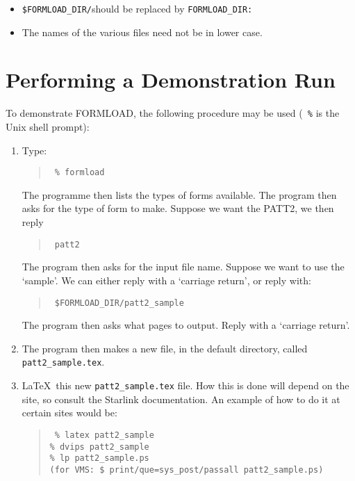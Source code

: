 \begin{itemize}
\item {\tt \$FORMLOAD\_DIR/}should be replaced by {\tt FORMLOAD\_DIR:}
\item The names of the various files need not be in lower case.
\end{itemize}

\section{Performing a Demonstration Run}
\label{s:demo}

To demonstrate FORMLOAD, the following procedure may be used ({\tt
\%} is the Unix shell prompt):

\begin{enumerate}

\item Type:

\begin{quote}\tt
\% formload
\end{quote}

The programme then lists the types of forms available.  The program
then asks for the type of form to make. Suppose we want the  PATT2, we
then reply

\begin{quote}\tt
patt2
\end{quote}

The program then asks for the input file name. Suppose we want to use
the `sample'. We can either reply with a `carriage return', or reply
with:

\begin{quote}\tt
\$FORMLOAD\_DIR/patt2\_sample
\end{quote}

The program then asks what pages to output. Reply with a `carriage return'.

\item The program then makes a new file, in the default directory, called
{\tt patt2\_sample.tex}.

\item \LaTeX\ this new {\tt patt2\_sample.tex} file. How this is done
will depend on the site, so consult the Starlink documentation. An
example of how to do it at certain sites would be:

\begin{quote}\tt
\% latex patt2\_sample \\
\% dvips patt2\_sample \\
\% lp patt2\_sample.ps \\
(for VMS: \$ print/que=sys\_post/passall patt2\_sample.ps)
\end{quote}


\end{enumerate}
